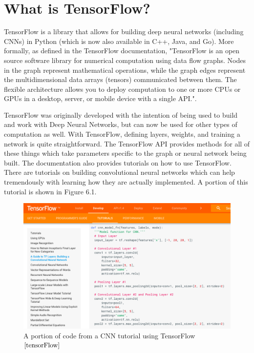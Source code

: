 \documentclass[12pt]{report} %
\begin{document}
\section{What is TensorFlow?}
	TensorFlow is a library that allows for building deep neural networks (including CNNs) in Python (which is now also available in C++, Java, and Go). More formally, as defined in the TensorFlow documentation,  "TensorFlow is an open source software library for numerical computation using data flow graphs. Nodes in the graph represent mathematical operations, while the graph edges represent the multidimensional data arrays (tensors) communicated between them. The flexible architecture allows you to deploy computation to one or more CPUs or GPUs in a desktop, server, or mobile device with a single API."\cite{tensorFlow}.
	
	TensorFlow was originally developed with the intention of being used to build and work with Deep Neural Networks, but can now be used for other types of computation as well. With TensorFlow, defining layers, weights, and training a network is quite straightforward. The TensorFlow API provides methods for all of these things which take parameters specific to the graph or neural network being built. The documentation also provides tutorials on how to use TensorFlow. There are tutorials on building convolutional neural networks which can help tremendously with learning how they are actually implemented. A portion of this tutorial is shown in Figure 6.1\cite{tensorFlow}.
\begin{figure}
\centering
\includegraphics[width=5in]{tensorflow_cnn}
\caption[TensorFlow Code Example]
	{A portion of code from a  CNN tutorial using TensorFlow$\cite{tensorFlow}$}
\end{figure}	
\end{document}
